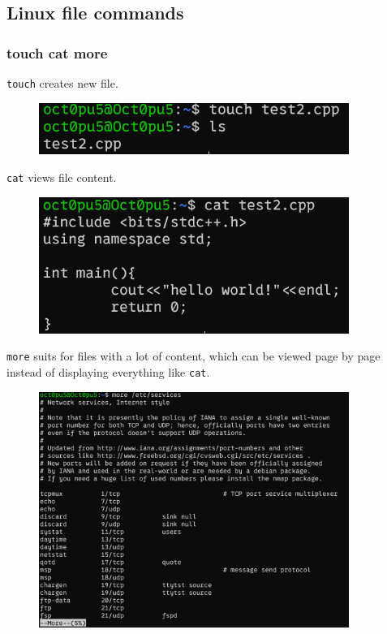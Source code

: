 \documentclass[12pt]{ctexart}
\begin{document}
\newpage
\subsection{\textbf{Linux file commands}}
\subsubsection{\textbf{touch cat more}}

\texttt{touch} creates new file.

\begin{figure}[H]
    \centering
    \includegraphics[width=0.9\textwidth,keepaspectratio]{assets/Linux/1.5 Linux file commands/1.png}
\end{figure}

\texttt{cat} views file content.

\begin{figure}[H]
    \centering
    \includegraphics[width=0.9\textwidth,keepaspectratio]{assets/Linux/1.5 Linux file commands/2.png}
\end{figure}

\texttt{more} suits for files with a lot of content, which can be viewed
page by page instead of displaying everything like \texttt{cat}.

\begin{figure}[H]
    \centering
    \includegraphics[width=0.9\textwidth,keepaspectratio]{assets/Linux/1.5 Linux file commands/3.png}
\end{figure}
\end{document}
